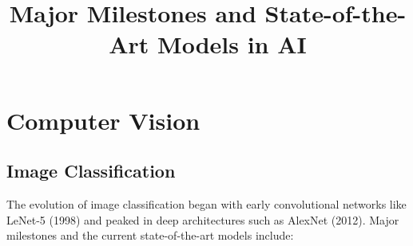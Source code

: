 \documentclass{article}
\title{Major Milestones and State-of-the-Art Models in AI}
\author{}
\date{}
\begin{document}
\maketitle

\section{Computer Vision}

\subsection{Image Classification}
The evolution of image classification began with early convolutional networks like LeNet-5 (1998) and peaked in deep architectures such as AlexNet (2012). Major milestones and the current state-of-the-art models include:
\end{document}
